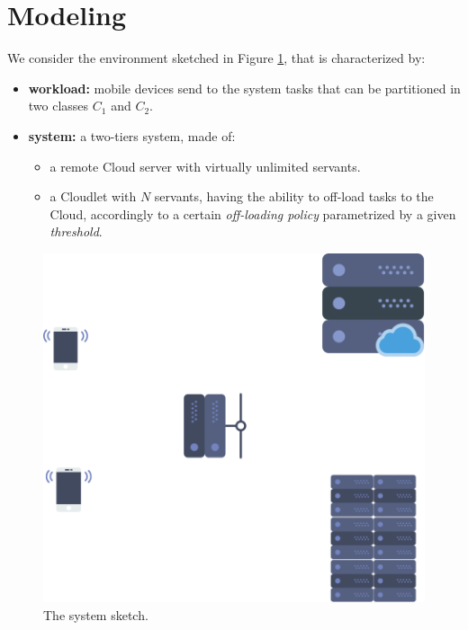 \section{Modeling}
\label{sec:modeling}


We consider the environment sketched in Figure \ref{fig:modeling-system-sketch}, that is characterized by:

\begin{itemize}
	\item  \textbf{workload:} mobile devices send to the system tasks that can be partitioned in two classes $C_{1}$ and $C_{2}$.
	\item \textbf{system:} a two-tiers system, made of:	
	\begin{itemize}
		\item a remote Cloud server with virtually unlimited servants.
		\item a Cloudlet with $N$ servants, having the ability to off-load tasks to the Cloud, accordingly to a certain \textit{off-loading policy} parametrized by a given \textit{threshold}.
	\end{itemize}
\end{itemize}

\begin{figure}
	\label{fig:modeling-system-sketch}
	\includegraphics[width=\columnwidth]{fig/modeling-system-sketch}
	\caption{The system sketch.}
\end{figure}

